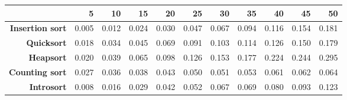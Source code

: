 \begin{tabular}{rrrrrrrrrrr}
\hline
                         &   \textbf{5} &   \textbf{10} &   \textbf{15} &   \textbf{20} &   \textbf{25} &   \textbf{30} &   \textbf{35} &   \textbf{40} &   \textbf{45} &   \textbf{50} \\
\hline
 \textbf{Insertion sort} &        0.005 &         0.012 &         0.024 &         0.030 &         0.047 &         0.067 &         0.094 &         0.116 &         0.154 &         0.181 \\
      \textbf{Quicksort} &        0.018 &         0.034 &         0.045 &         0.069 &         0.091 &         0.103 &         0.114 &         0.126 &         0.150 &         0.179 \\
       \textbf{Heapsort} &        0.020 &         0.039 &         0.065 &         0.098 &         0.126 &         0.153 &         0.177 &         0.224 &         0.244 &         0.295 \\
  \textbf{Counting sort} &        0.027 &         0.036 &         0.038 &         0.043 &         0.050 &         0.051 &         0.053 &         0.061 &         0.062 &         0.064 \\
      \textbf{Introsort} &        0.008 &         0.016 &         0.029 &         0.042 &         0.052 &         0.067 &         0.069 &         0.080 &         0.093 &         0.123 \\
\hline
\end{tabular}